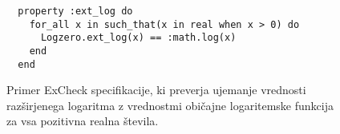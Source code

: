 \begin{figure}
\begin{verbatim}
  property :ext_log do
    for_all x in such_that(x in real when x > 0) do
      Logzero.ext_log(x) == :math.log(x)
    end
  end
\end{verbatim}
\caption{%
Primer ExCheck specifikacije, ki preverja ujemanje vrednosti razširjenega logaritma z vrednostmi običajne logaritemske funkcija za vsa pozitivna realna števila.}
\label{fig:impl:excheck_extended_logarithm}
\end{figure}
